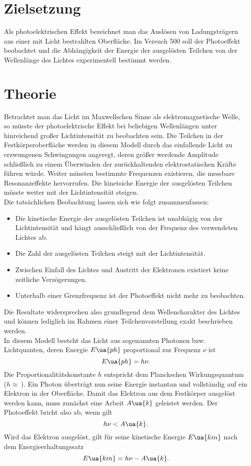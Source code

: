 \setcounter{page}{1}
\section*{Zielsetzung}
Als photoelektrischen Effekt bezeichnet man das Auslösen von Ladungsträgern aus einer
mit Licht bestrahlten Oberfläche. Im Versuch 500 soll der Photoeffekt beobachtet und die
Abhängigkeit der Energie der ausgelösten Teilchen von der Wellenlänge des Lichtes experimentell
bestimmt werden.
\section{Theorie}
Betrachtet man das Licht im Maxwellschen Sinne als elektromagnetische Welle, so müsste
der photoelektrische Effekt bei beliebigen Wellenlängen unter hinreichend großer
Lichtintensität zu beobachten sein. Die Teilchen in der Festkörperoberfläche werden in diesem
Modell durch das einfallende Licht zu erzwungenen Schwingungen angeregt, deren größer werdende
Amplitude schließlich zu einem Überwinden der zurückhaltenden elektrostatischen Kräfte führen würde.
Weiter müssten bestimmte Frequenzen existieren, die messbare Resonanzeffekte hervorrufen. Die kinetsiche
Energie der ausgelösten Teilchen müsste weiter mit der Lichtintensität steigen.\\
Die tatsächlichen Beobachtung lassen sich wie folgt zusammenfassen:
\begin{itemize}
  \item Die kinetische Energie der ausgelösten Teilchen ist unabhägig von der Lichtintensität und
  hängt ausschließlich von der Frequenz des verwendeten Lichtes ab.
  \item Die Zahl der ausgelösten Teilchen steigt mit der Lichtintensität.
  \item Zwischen Einfall des Lichtes und Austritt der Elektronen existiert keine zeitliche Verzögerungen.
  \item Unterhalb einer Grenzfrequenz ist der Photoeffekt nicht mehr zu beobachten.
\end{itemize}
Die Resultate widersprechen also grundlegend dem Wellencharakter des Lichtes und können lediglich im
Rahmen einer Teilchenvorstellung exakt beschrieben werden.\\
In diesem Modell besteht das Licht aus sogenannten Photonen bzw. Lichtquanten, deren Energie $E\ua{ph}$ proportional
zur Frequenz $\nu$ ist
\begin{equation}
E\ua{ph} = h \nu.
\end{equation}
Die Proportionalitätskonstante $h$ entspricht dem Planckschen Wirkungsquantum ($h \approx \SI{}{}$). Ein Photon
überträgt nun seine Energie instantan und vollständig auf ein Elektron in der Oberfläche. Damit das Elektron
aus dem Festkörper ausgelöst werden kann, muss zunächst eine Arbeit $A\ua{k}$ geleistet werden. Der Photoeffekt bricht
also ab, wenn gilt
\begin{equation}
  h\nu < A\ua{k}.
\end{equation}
Wird das Elektron ausgelöst, gilt für seine kinetische Energie $E\ua{kin}$ nach dem Energieerhaltungssatz
\begin{equation}
  E\ua{kin} = h\nu - A\ua{k}.
\end{equation}
